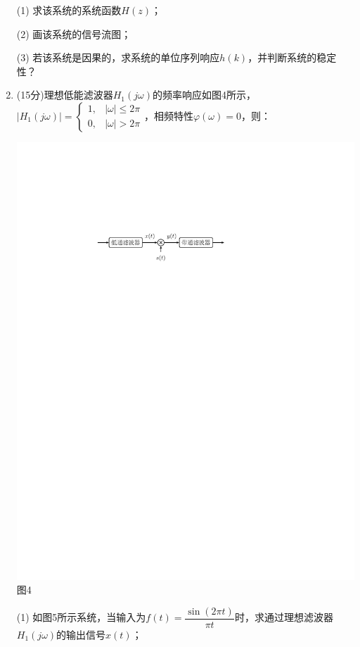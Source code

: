 \documentclass[11pt]{ctexart}
\begin{document}
\begin{enumerate}[leftmargin=0em]
(1) 求该系统的系统函数$H(z)$；

(2) 画该系统的信号流图；

(3) 若该系统是因果的，求系统的单位序列响应$h(k)$，并判断系统的稳定性？
\vfill\newpage
\item (15分)理想低能滤波器$H_1(j\omega)$的频率响应如图4所示，$|H_1(j\omega)|=\begin{cases}
1,&|\omega|\leqslant 2\pi\\
0,&|\omega|> 2\pi
\end{cases}$，相频特性$\varphi(\omega)=0$，则：
\begin{center}
\includegraphics{img/5.pdf}\\
{图4}
\end{center}
(1) 如图5所示系统，当输入为$f(t)=\dfrac{\sin(2\pi t)}{\pi t}$时，求通过理想滤波器$H_1(j\omega)$的输出信号$x(t)$；


\end{enumerate}
\end{document}

